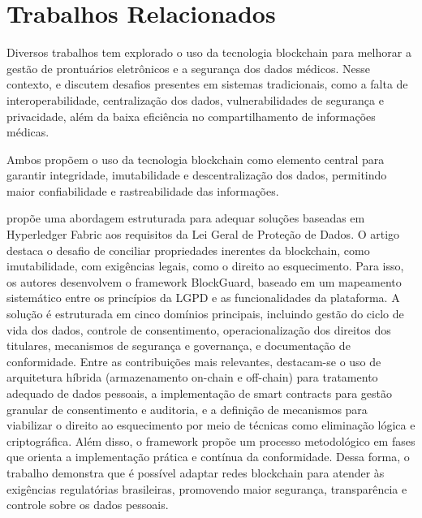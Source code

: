 \chapter[Trabalhos Relacionados]{Trabalhos Relacionados}

Diversos trabalhos tem explorado o uso da tecnologia blockchain para
melhorar a gestão de prontuários eletrônicos e a segurança dos dados
médicos. Nesse contexto,
\cite{BlockchainVehiclesForEfficientMedicalRecordManagement} e
\cite{MedicalRecordSystemUsingBlockchainBigDataAndTokenization}
discutem desafios presentes em sistemas tradicionais, como a falta de
interoperabilidade, centralização dos dados, vulnerabilidades de
segurança e privacidade, além da baixa eficiência no compartilhamento
de informações médicas.

Ambos propõem o uso da tecnologia blockchain
como elemento central para garantir integridade, imutabilidade e
descentralização dos dados, permitindo maior confiabilidade e
rastreabilidade das informações.

\cite{BlockGuardLGPDHyperledgerFabric} propõe uma abordagem
estruturada para adequar soluções baseadas em Hyperledger Fabric aos
requisitos da Lei Geral de Proteção de Dados. O artigo destaca o
desafio de conciliar propriedades inerentes da blockchain, como
imutabilidade, com exigências legais, como o direito ao esquecimento.
Para isso, os autores desenvolvem o framework BlockGuard, baseado em
um mapeamento sistemático entre os princípios da LGPD e as
funcionalidades da plataforma. A solução é estruturada em cinco
domínios principais, incluindo gestão do ciclo de vida dos dados,
controle de consentimento, operacionalização dos direitos dos
titulares, mecanismos de segurança e governança, e documentação de
conformidade. Entre as contribuições mais relevantes, destacam-se o
uso de arquitetura híbrida (armazenamento on-chain e off-chain) para
tratamento adequado de dados pessoais, a implementação de smart
contracts para gestão granular de consentimento e auditoria, e a
definição de mecanismos para viabilizar o direito ao esquecimento por
meio de técnicas como eliminação lógica e criptográfica. Além disso,
o framework propõe um processo metodológico em fases que orienta a
implementação prática e contínua da conformidade. Dessa forma, o
trabalho demonstra que é possível adaptar redes blockchain para
atender às exigências regulatórias brasileiras, promovendo maior
segurança, transparência e controle sobre os dados pessoais.
